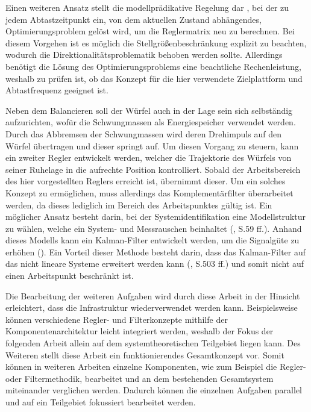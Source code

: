 Einen weiteren Ansatz stellt die modellprädikative Regelung dar \cite{MPC}, bei der zu jedem Abtastzeitpunkt ein, von dem aktuellen Zustand abhängendes, Optimierungsproblem gelöst wird, um die Reglermatrix neu zu berechnen. Bei diesem Vorgehen ist es möglich die Stellgrößenbeschränkung explizit zu beachten, wodurch die Direktionalitätsproblematik behoben werden sollte. Allerdings benötigt die Lösung des Optimierungsproblems eine beachtliche Rechenleistung, weshalb zu prüfen ist, ob das Konzept für die hier verwendete Zielplattform und Abtastfrequenz geeignet ist.

Neben dem Balancieren soll der Würfel auch in der Lage sein sich selbständig aufzurichten, wofür die Schwungmassen als Energiespeicher verwendet werden. Durch das Abbremsen der Schwungmassen wird deren Drehimpuls auf den Würfel übertragen und dieser springt auf. Um diesen Vorgang zu steuern, kann ein zweiter Regler entwickelt werden, welcher die Trajektorie des Würfels von seiner Ruhelage in die aufrechte Position kontrolliert. Sobald der Arbeitsbereich des hier vorgestellten Reglers erreicht ist, übernimmt dieser. Um ein solches Konzept zu ermöglichen, muss allerdings das Komplementärfilter überarbeitet werden, da dieses lediglich im Bereich des Arbeitspunktes gültig ist. Ein möglicher Ansatz besteht darin,  bei der Systemidentifikation eine Modellstruktur zu wählen, welche ein System- und Messrauschen beinhaltet (\cite{UnbehauenSysId}, S.59 ff.). Anhand dieses Modells kann ein Kalman-Filter entwickelt werden, um die Signalgüte zu erhöhen (\cite{KalmanFilter}). Ein Vorteil dieser Methode besteht darin, dass das Kalman-Filter auf das nicht lineare Systeme erweitert werden kann (\cite{AdamyNL}, S.503 ff.) und somit nicht auf einen Arbeitspunkt beschränkt ist.

Die Bearbeitung der weiteren Aufgaben wird durch diese Arbeit in der Hinsicht erleichtert, dass die Infrastruktur wiederverwendet werden kann. Beispielsweise können verschiedene Regler- und Filterkonzepte mithilfe der Komponentenarchitektur leicht integriert werden, weshalb der Fokus der folgenden Arbeit allein auf dem systemtheoretischen Teilgebiet liegen kann. Des Weiteren stellt diese Arbeit ein funktionierendes Gesamtkonzept vor. Somit können in weiteren Arbeiten einzelne Komponenten, wie zum Beispiel die Regler- oder Filtermethodik, bearbeitet und an dem bestehenden Gesamtsystem miteinander verglichen werden. Dadurch können die einzelnen Aufgaben parallel und auf ein Teilgebiet fokussiert bearbeitet werden.
